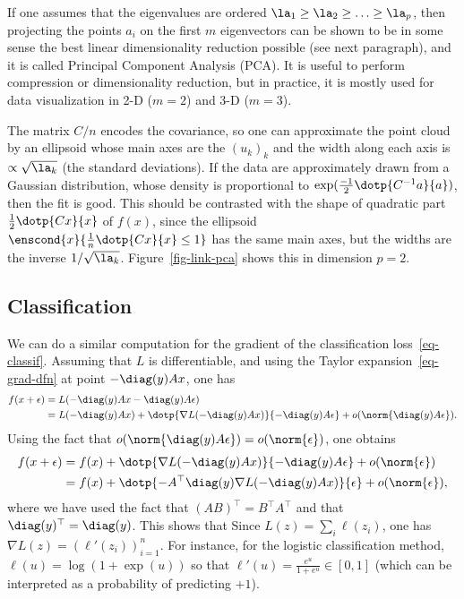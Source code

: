 If one assumes that the eigenvalues are ordered $\la_1 \geq \la_2 \geq \ldots \geq \la_p$, then projecting the points $a_i$ on the first $m$ eigenvectors can be shown to be in some sense the best linear dimensionality reduction possible (see next paragraph), and it is called Principal Component Analysis (PCA). It is useful to perform compression or dimensionality reduction, but in practice, it is mostly used for data visualization in 2-D ($m=2$) and 3-D ($m=3$).

The matrix $C/n$ encodes the covariance, so one can approximate the point cloud by an ellipsoid whose main axes are the $(u_k)_k$ and the width along each axis is $\propto \sqrt{\la_k}$ (the standard deviations). 
%
If the data are approximately drawn from a Gaussian distribution, whose density is proportional to $\exp(\frac{-1}{2}\dotp{C^{-1}a}{a})$, then the fit is good.
%
This should be contrasted with the shape of quadratic part $\frac{1}{2}\dotp{Cx}{x}$ of $f(x)$, since the ellipsoid $\enscond{x}{\frac{1}{n}\dotp{Cx}{x} \leq 1}$ has the same main axes, but the widths are the inverse $1/\sqrt{\la_k}$. 
%
Figure~\ref{fig-link-pca} shows this in dimension $p=2$.



\subsection{Classification}

We can do a similar computation for the gradient of the classification loss~\eqref{eq-classif}. Assuming that $L$ is differentiable, and using the Taylor expansion~\eqref{eq-grad-dfn} at point $-\diag(y) Ax$, one has 
\begin{align*}
	f(x+\epsilon) &= L( -\diag(y) Ax -\diag(y)  A\epsilon) \\
	&= L(-\diag(y) Ax) + \dotp{\nabla L( -\diag(y) Ax)}{ -\diag(y)  A\epsilon } + o(\norm{\diag(y)  A\epsilon}).
\end{align*} 
Using the fact that $o(\norm{\diag(y)  A\epsilon}) = o(\norm{\epsilon})$, one obtains
\begin{align*}
	f(x+\epsilon) &= f(x) + \dotp{\nabla L( -\diag(y) Ax)}{-\diag(y)  A\epsilon} + o(\norm{\epsilon}) \\
		 &=  f(x) + \dotp{-A^\top \diag(y) \nabla L( -\diag(y) Ax)}{\epsilon} + o(\norm{\epsilon}), 
\end{align*} 	
where we have used the fact that $(AB)^\top = B^\top A^\top$ and that $\diag(y)^\top=\diag(y)$. This shows that
Since $L(z) = \sum_i \ell(z_i)$, one has $\nabla L(z) = (\ell'(z_i))_{i=1}^n$. For instance, for the logistic classification method, $\ell(u) = \log(1+\exp(u))$ so that $\ell'(u) = \frac{e^u}{1+e^u} \in [0,1]$ (which can be interpreted as a probability of predicting $+1$).



